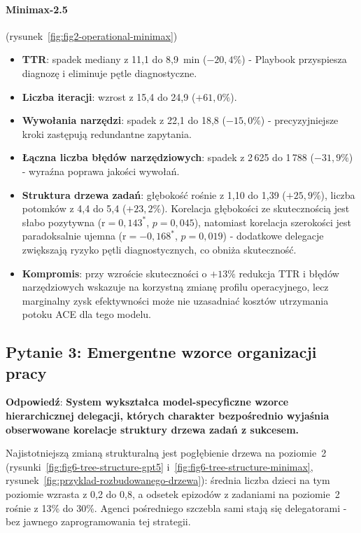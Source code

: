 \paragraph{Minimax-2.5} (rysunek~\ref{fig:fig2-operational-minimax})
\begin{itemize}
    \item \textbf{TTR}: spadek mediany z 11,1 do 8,9~min ($-20{,}4\%$) - Playbook przyspiesza diagnozę i eliminuje pętle diagnostyczne.
    \item \textbf{Liczba iteracji}: wzrost z 15,4 do 24,9 ($+61{,}0\%$).
    \item \textbf{Wywołania narzędzi}: spadek z 22,1 do 18,8 ($-15{,}0\%$) - precyzyjniejsze kroki zastępują redundantne zapytania.
    \item \textbf{Łączna liczba błędów narzędziowych}: spadek z 2\,625 do 1\,788 ($-31{,}9\%$) - wyraźna poprawa jakości wywołań.
    \item \textbf{Struktura drzewa zadań}: głębokość rośnie z 1,10 do 1,39 ($+25{,}9\%$), liczba potomków z 4,4 do 5,4 ($+23{,}2\%$). Korelacja głębokości ze skutecznością jest słabo pozytywna (r$=0{,}143^{*}$, $p{=}0{,}045$), natomiast korelacja szerokości jest paradoksalnie ujemna (r$=-0{,}168^{*}$, $p{=}0{,}019$) - dodatkowe delegacje zwiększają ryzyko pętli diagnostycznych, co obniża skuteczność.
    \item \textbf{Kompromis}: przy wzroście skuteczności o $+13\%$ redukcja TTR i błędów narzędziowych wskazuje na korzystną zmianę profilu operacyjnego, lecz marginalny zysk efektywności może nie uzasadniać kosztów utrzymania potoku ACE dla tego modelu.
\end{itemize}

\subsection{Pytanie 3: Emergentne wzorce organizacji pracy}

\textbf{Odpowiedź}: \textbf{System wykształca model-specyficzne wzorce hierarchicznej delegacji, których charakter bezpośrednio wyjaśnia obserwowane korelacje struktury drzewa zadań z sukcesem.}

Najistotniejszą zmianą strukturalną jest pogłębienie drzewa na poziomie~2 (rysunki~\ref{fig:fig6-tree-structure-gpt5} i~\ref{fig:fig6-tree-structure-minimax}, rysunek~\ref{fig:przyklad-rozbudowanego-drzewa}): średnia liczba dzieci na tym poziomie wzrasta z 0,2 do 0,8, a odsetek epizodów z zadaniami na poziomie~2 rośnie z 13\% do 30\%. Agenci pośredniego szczebla sami stają się delegatorami - bez jawnego zaprogramowania tej strategii.

